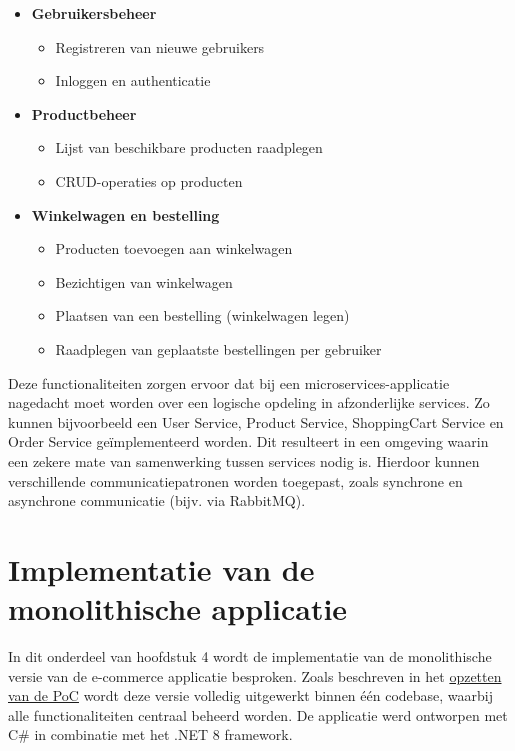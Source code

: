 \begin{itemize}
	\item \textbf{Gebruikersbeheer}
	\begin{itemize}
		\item Registreren van nieuwe gebruikers
		\item Inloggen en authenticatie
	\end{itemize}
	\item \textbf{Productbeheer}
	\begin{itemize}
		\item Lijst van beschikbare producten raadplegen
		\item CRUD-operaties op producten
	\end{itemize}
	\item \textbf{Winkelwagen en bestelling}
	\begin{itemize}
		\item Producten toevoegen aan winkelwagen
		\item Bezichtigen van winkelwagen
		\item Plaatsen van een bestelling (winkelwagen legen)
		\item Raadplegen van geplaatste bestellingen per gebruiker
	\end{itemize}
\end{itemize}

Deze functionaliteiten zorgen ervoor dat bij een microservices-applicatie nagedacht moet worden over een logische opdeling in afzonderlijke services. Zo kunnen bijvoorbeeld een User Service, Product Service, ShoppingCart Service en Order Service geïmplementeerd worden. Dit resulteert in een omgeving waarin een zekere mate van samenwerking tussen services nodig is. Hierdoor kunnen verschillende communicatiepatronen worden toegepast, zoals synchrone en asynchrone communicatie (bijv. via RabbitMQ).

\section{Implementatie van de monolithische applicatie}

In dit onderdeel van hoofdstuk 4 wordt de implementatie van de monolithische versie van de e-commerce applicatie besproken. Zoals beschreven in het \hyperref[opzetten_poc]{opzetten van de PoC} wordt deze versie volledig uitgewerkt binnen één codebase, waarbij alle functionaliteiten centraal beheerd worden. De applicatie werd ontworpen met C\# in combinatie met het .NET 8 framework.


